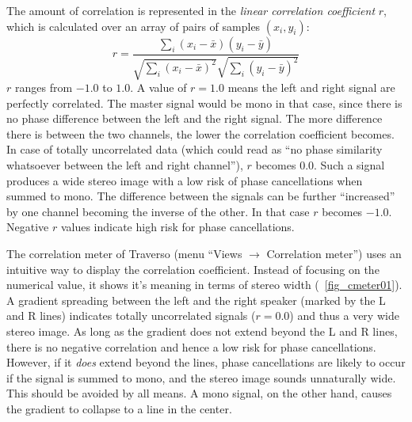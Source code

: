 The amount of correlation is represented in the \emph{linear correlation coefficient} $r$, which is calculated over an array of pairs of samples $(x_i,y_i)$:
\[
r = \frac{\sum\limits_{i}(x_i - \bar{x})(y_i - \bar{y})}{\sqrt{\sum\limits_{i}(x_i - \bar{x})^2} \sqrt{\sum\limits_{i}(y_i - \bar{y})^2}}
\]
$r$ ranges from $-1.0$ to $1.0$. A value of $r = 1.0$ means the left and right signal are perfectly correlated. The master signal would be mono in that case, since there is no phase difference between the left and the right signal. The more difference there is between the two channels, the lower the correlation coefficient becomes. In case of totally uncorrelated data (which could read as ``no phase similarity whatsoever between the left and right channel''), $r$ becomes 0.0. Such a signal produces a wide stereo image with a low risk of phase cancellations when summed to mono. The difference between the signals can be further ``increased'' by one channel becoming the inverse of the other. In that case $r$ becomes $-1.0$. Negative $r$ values indicate high risk for phase cancellations.

The correlation meter of Traverso (menu ``Views $\rightarrow$ Correlation meter'') uses an intuitive way to display the correlation coefficient. Instead of focusing on the numerical value, it shows it's meaning in terms of stereo width (\FigB\ \ref{fig_cmeter01}). A gradient spreading between the left and the right speaker (marked by the L and R lines) indicates totally uncorrelated signals ($r = 0.0$) and thus a very wide stereo image. As long as the gradient does not extend beyond the L and R lines, there is no negative correlation and hence a low risk for phase cancellations. However, if it \emph{does} extend beyond the lines, phase cancellations are likely to occur if the signal is summed to mono, and the stereo image sounds unnaturally wide. This should be avoided by all means. A mono signal, on the other hand, causes the gradient to collapse to a line in the center.


